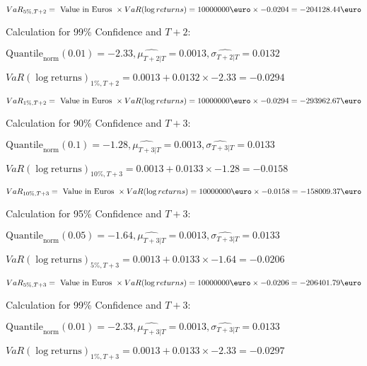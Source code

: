\indent\indent $VaR_{5\%, T + 2} = \text{ Value in Euros } \times VaR(\log returns) = 10 000 000 \text{\euro} \times-0.0204 = -204128.44 \text{\euro}$\newline




Calculation for 99\% Confidence and $T+2$:

\indent\indent $\text{Quantile}_\text{norm}(0.01) = -2.33,\hat{\mu_{T+2|T}} = 0.0013, \hat{\sigma_{T+2|T}} = 0.0132$

\indent\indent $VaR(\log \text{returns})_{1\%, T + 2} = 0.0013 + 0.0132\times-2.33 = -0.0294$

\indent\indent $VaR_{1\%, T + 2} = \text{ Value in Euros } \times VaR(\log returns) = 10 000 000 \text{\euro} \times-0.0294 = -293962.67 \text{\euro}$\newline




Calculation for 90\% Confidence and $T+3$:

\indent\indent $\text{Quantile}_\text{norm}(0.1) = -1.28,\hat{\mu_{T+3|T}} = 0.0013, \hat{\sigma_{T+3|T}} = 0.0133$

\indent\indent $VaR(\log \text{returns})_{10\%, T + 3} = 0.0013 + 0.0133\times-1.28 = -0.0158$

\indent\indent $VaR_{10\%, T + 3} = \text{ Value in Euros } \times VaR(\log returns) = 10 000 000 \text{\euro} \times-0.0158 = -158009.37 \text{\euro}$\newline




Calculation for 95\% Confidence and $T+3$:

\indent\indent $\text{Quantile}_\text{norm}(0.05) = -1.64,\hat{\mu_{T+3|T}} = 0.0013, \hat{\sigma_{T+3|T}} = 0.0133$

\indent\indent $VaR(\log \text{returns})_{5\%, T + 3} = 0.0013 + 0.0133\times-1.64 = -0.0206$

\indent\indent $VaR_{5\%, T + 3} = \text{ Value in Euros } \times VaR(\log returns) = 10 000 000 \text{\euro} \times-0.0206 = -206401.79 \text{\euro}$\newline




Calculation for 99\% Confidence and $T+3$:

\indent\indent $\text{Quantile}_\text{norm}(0.01) = -2.33,\hat{\mu_{T+3|T}} = 0.0013, \hat{\sigma_{T+3|T}} = 0.0133$

\indent\indent $VaR(\log \text{returns})_{1\%, T + 3} = 0.0013 + 0.0133\times-2.33 = -0.0297$

